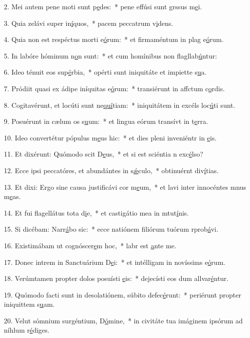 2. Mei autem pene moti sunt p\uline{e}des:~* pene effúsi sunt grssus m\uline{e}i.\par 
3. Quia zelávi super in\uline{í}quos,~* pacem peccatrum v\uline{i}dens.\par 
4. Quia non est respéctus morti e\uline{ó}rum:~* et firmaméntum in plag e\uline{ó}rum.\par 
5. In labóre hóminum n\uline{o}n sunt:~* et cum homínibus non flagllab\uline{ú}ntur:\par 
6. Ideo ténuit eos sup\uline{é}rbia,~* opérti sunt iniquitáte et impiette s\uline{u}a.\par 
7. Pródiit quasi ex ádipe iníquitas e\uline{ó}rum:~* transiérunt in affctum c\uline{o}rdis.\par 
8. Cogitavérunt, et locúti sunt ne\uline{quí}tiam:~* iniquitátem in excéls loc\uline{ú}ti sunt.\par 
9. Posuérunt in cælum os s\uline{u}um:~* et lingua eórum transívt in t\uline{e}rra.\par 
10. Ideo convertétur pópulus m\uline{e}us hic:~* et dies pleni inveniéntr in \uline{e}is.\par 
11. Et dixérunt: Quómodo scit D\uline{e}us,~* et si est sciéntia n exc\uline{é}lso?\par 
12. Ecce ipsi peccatóres, et abundántes in s\uline{ǽ}culo,~* obtinuérnt div\uline{í}tias.\par 
13. Et dixi: Ergo sine causa justificávi cor m\uline{e}um,~* et lavi inter innocéntes mnus m\uline{e}as.\par 
14. Et fui flagellátus tota d\uline{i}e,~* et castigátio mea in mtut\uline{í}nis.\par 
15. Si dicébam: Narr\uline{á}bo sic:~* ecce natiónem filiórum tuórum rprob\uline{á}vi.\par 
16. Existimábam ut cognóscer\uline{e}m hoc,~* labr est \uline{a}nte me.\par 
17. Donec intrem in Sanctuárium D\uline{e}i:~* et intélligam in novíssims e\uline{ó}rum.\par 
18. Verúmtamen propter dolos posuísti \uline{e}is:~* dejecísti eos dum allvar\uline{é}ntur.\par 
19. Quómodo facti sunt in desolatiónem, súbito defec\uline{é}runt:~* periérunt propter iniquittem s\uline{u}am.\par 
20. Velut sómnium surgéntium, D\uline{ó}mine,~* in civitáte tua imáginem ipsórum ad níhlum r\uline{é}diges.\par 
